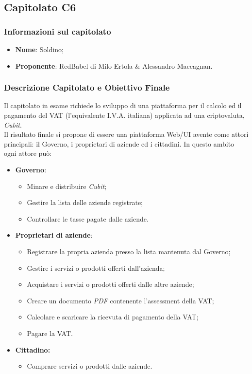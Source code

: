 \subsection{Capitolato C6}\label{C6}

\subsubsection{Informazioni sul capitolato}
\begin{itemize}
  \item \textbf{Nome}: Soldino;
  \item \textbf{Proponente}: RedBabel di Milo Ertola \& Alessandro Maccagnan.
\end{itemize}
\subsubsection{Descrizione Capitolato e Obiettivo Finale}
Il capitolato in esame richiede lo sviluppo di una piattaforma per il calcolo ed il pagamento del VAT (l'equivalente I.V.A. italiana) applicata ad una criptovaluta, \textit{Cubit}\glossario. \\
Il risultato finale si propone di essere una piattaforma Web/UI avente come attori principali: il Governo, i proprietari di aziende ed i cittadini. In questo ambito ogni attore può:
\begin{itemize}
  \item \textbf{Governo}:
  \begin{itemize}
    \item Minare e distribuire \textit{Cubit};
    \item Gestire la lista delle aziende registrate;
    \item Controllare le tasse pagate dalle aziende.
  \end{itemize}
  \item \textbf{Proprietari di aziende}:
  \begin{itemize}
    \item Registrare la propria azienda presso la lista mantenuta dal Governo;
    \item Gestire i servizi o prodotti offerti dall'azienda;
    \item Acquistare i servizi o prodotti offerti dalle altre aziende;
    \item Creare un documento \textit{PDF} contenente l'assessment della VAT;
    \item Calcolare e scaricare la ricevuta di pagamento della VAT;
    \item Pagare la VAT.
  \end{itemize}
  \item \textbf{Cittadino:}
  \begin{itemize}
    \item Comprare servizi o prodotti dalle aziende.
  \end{itemize}
\end{itemize}

